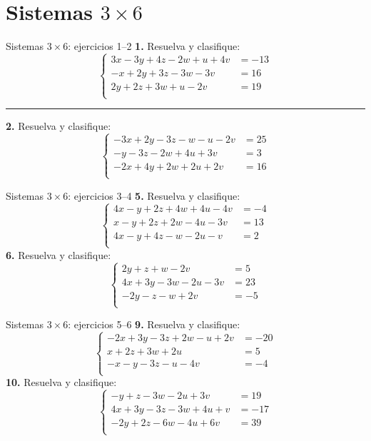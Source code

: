 \documentclass[aspectratio=169]{beamer}
\begin{document}
\section{Sistemas $3\times 6$}
\begin{frame}{Sistemas $3\times 6$: ejercicios 1--2}
\scriptsize
\textbf{1.} Resuelva y clasifique:
\[\left\{\begin{aligned}
3x-3y+4z-2w+u+4v&=-13\\
-x+2y+3z-3w-3v&=16\\
2y+2z+3w+u-2v&=19\\
\end{aligned}\right.\]
\vspace{0.2em}\hrule\vspace{0.3em}
\textbf{2.} Resuelva y clasifique:
\[\left\{\begin{aligned}
-3x+2y-3z-w-u-2v&=25\\
-y-3z-2w+4u+3v&=3\\
-2x+4y+2w+2u+2v&=16\\
\end{aligned}\right.\]
\end{frame}
\begin{frame}{Sistemas $3\times 6$: ejercicios 3--4}
\scriptsize
\textbf{5.} Resuelva y clasifique:
\[\left\{\begin{aligned}
4x-y+2z+4w+4u-4v&=-4\\
x-y+2z+2w-4u-3v&=13\\
4x-y+4z-w-2u-v&=2\\
\end{aligned}\right.\]
\textbf{6.} Resuelva y clasifique:
\[\left\{\begin{aligned}
2y+z+w-2v&=5\\
4x+3y-3w-2u-3v&=23\\
-2y-z-w+2v&=-5\\
\end{aligned}\right.\]
\end{frame}
\begin{frame}{Sistemas $3\times 6$: ejercicios 5--6}
\scriptsize
\textbf{9.} Resuelva y clasifique:
\[\left\{\begin{aligned}
-2x+3y-3z+2w-u+2v&=-20\\
x+2z+3w+2u&=5\\
-x-y-3z-u-4v&=-4\\
\end{aligned}\right.\]
\textbf{10.} Resuelva y clasifique:
\[\left\{\begin{aligned}
-y+z-3w-2u+3v&=19\\
4x+3y-3z-3w+4u+v&=-17\\
-2y+2z-6w-4u+6v&=39\\
\end{aligned}\right.\]
\end{frame}
\end{document}
